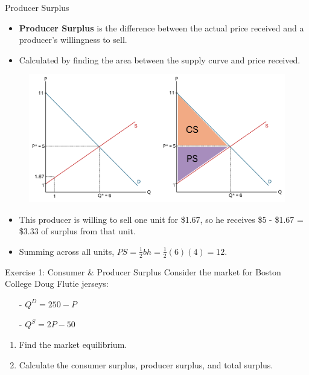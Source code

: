 \documentclass[9pt, handout]{beamer}
\begin{document}
\begin{frame}{Producer Surplus}
    \begin{itemize}
        \item \textbf{Producer Surplus} is the difference between the actual price received and a producer's willingness to sell.
        \item Calculated by finding the area between the supply curve and price received.
    \end{itemize}
    \begin{figure}
        \centering
        \includegraphics[width=0.85\linewidth]{Picture3.png}
    \end{figure}
    \begin{itemize}
        \item This producer is willing to sell one unit for \$1.67, so he receives \$5 - \$1.67 = \$3.33 of surplus from that unit.
        \item Summing across all units, $PS = \frac{1}{2}bh = \frac{1}{2}(6)(4) = 12$.
    \end{itemize}
\end{frame}

\begin{frame}{Exercise 1: Consumer \& Producer Surplus}
    Consider the market for Boston College Doug Flutie jerseys: 
    \begin{itemize}
        \item[-] $Q^D = 250 - P$
        \item[-] $Q^S = 2P - 50$
    \end{itemize}
    \begin{enumerate}
        \item Find the market equilibrium.
        \item Calculate the consumer surplus, producer surplus, and total surplus.
    \end{enumerate}
\end{frame}
\end{document}
